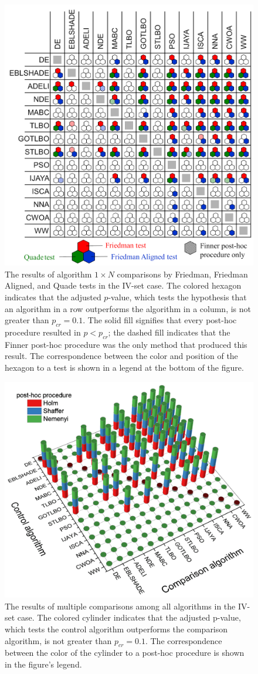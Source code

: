 \documentclass[a4paper,fleqn]{cas-sc}
\begin{document}
\begin{figure}[]
	\centering
		\includegraphics[width=0.5\columnwidth]{N1Tresult}
	  \caption{The results of algorithm $1\times N$ comparisons by Friedman, Friedman Aligned, and Quade tests in the IV-set case.
               The colored hexagon indicates that the adjusted $p$-value,
               which tests the hypothesis that an algorithm in a row outperforms the algorithm in a column,
               is not greater than $p_{cr}=0.1$.
               The solid fill signifies that every post-hoc procedure resulted in $p<p_{cr}$;
               the dashed fill indicates that the Finner post-hoc procedure was the only method that produced this result.
               The correspondence between the color and position of the hexagon to a test
               is shown in a legend at the bottom of the figure.
               }\label{figN1RezIVset}
\end{figure}


\begin{figure}[]
	\centering
		\includegraphics[width=0.5\columnwidth]{NNresult}
	  \caption{The results of multiple comparisons among all algorithms in the IV-set case.
               The colored cylinder indicates that the adjusted p-value,
               which tests the control algorithm outperforms the comparison algorithm,
               is not greater than $p_{cr}=0.1$.
               The correspondence between the color of the cylinder to a post-hoc procedure is shown in the figure's legend.
               }\label{figNNRezIVset}
\end{figure}
\end{document}
